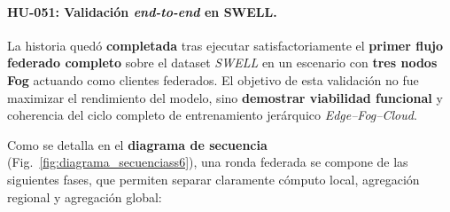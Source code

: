 \documentclass{report}
\begin{document}
\vspace{0.15em}

\paragraph{HU-051: Validación \emph{end-to-end} en SWELL.}
La historia quedó \textbf{completada} tras ejecutar satisfactoriamente el \textbf{primer flujo federado completo} sobre el dataset \textit{SWELL} en un escenario con \textbf{tres nodos Fog} actuando como clientes federados. El objetivo de esta validación no fue maximizar el rendimiento del modelo, sino \textbf{demostrar viabilidad funcional} y coherencia del ciclo completo de entrenamiento jerárquico \textit{Edge--Fog--Cloud}.

Como se detalla en el \textbf{diagrama de secuencia} (Fig.~\ref{fig:diagrama_secuenciass6}), una ronda federada se compone de las siguientes fases, que permiten separar claramente cómputo local, agregación regional y agregación global:
\end{document}
